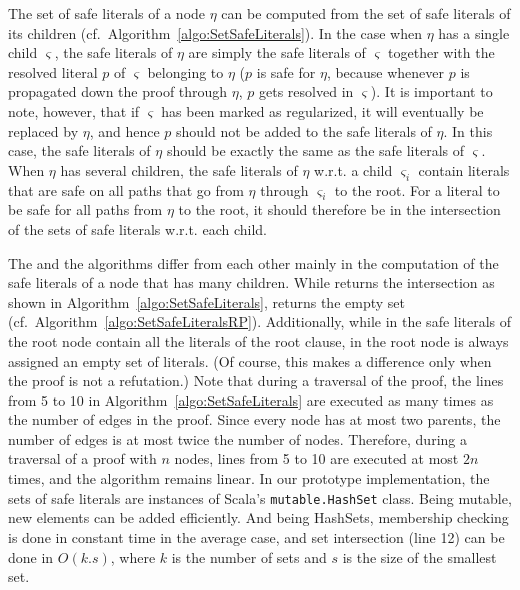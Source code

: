 The set of safe literals of a node $\eta$ can be computed from the set of safe
literals of its children (cf.\ Algorithm~\ref{algo:SetSafeLiterals}). In the case when $\eta$ has a single child $\varsigma$, the safe literals of $\eta$ are simply the safe literals of $\varsigma$ together with the resolved literal $p$ of $\varsigma$ belonging to $\eta$ ($p$ is safe for $\eta$, because whenever $p$ is propagated down the proof through $\eta$, $p$ gets resolved in $\varsigma$). It is important to note, however, that if $\varsigma$ has been marked as regularized, it will eventually be replaced by $\eta$, and hence $p$ should not be added to the safe literals of $\eta$. In this case, the safe literals of $\eta$ should be exactly the same as the safe literals of $\varsigma$. When $\eta$ has several children, the safe literals of $\eta$ w.r.t. a child $\varsigma_i$ contain literals that are safe on all paths that go from $\eta$ through $\varsigma_i$ to the root. For a literal to be safe for all paths from $\eta$ to the root, it should therefore be in the intersection of the sets of safe literals w.r.t. each child.


The {\RP} and the {\RPI} algorithms differ from each other mainly in the
computation of the safe literals of a node that has many children. While {\RPI}
returns the intersection as shown in Algorithm~\ref{algo:SetSafeLiterals}, {\RP}
returns the empty set (cf.\ Algorithm~\ref{algo:SetSafeLiteralsRP}). Additionally, while in {\RPI} the safe literals of the root node contain all the literals of the root clause, in {\RP} the root node is always assigned an empty set of literals. 
(Of course, this makes a difference only when the proof is not a refutation.)
Note that during a traversal of the proof, 
the lines from 5 to 10 in Algorithm~\ref{algo:SetSafeLiterals} are executed as many times as the number of edges in the proof. 
Since every node has at most two parents, the number of edges is at most twice the number of nodes. 
Therefore, during a traversal of a proof with $n$ nodes, lines from 5 to 10 are
executed at most $2n$ times, and the algorithm remains linear.
In our prototype implementation, the sets of safe literals are instances of Scala's 
\texttt{mutable.HashSet} class. Being mutable, new elements can be added efficiently.
And being HashSets, membership checking is done in constant time in the average case, 
and set intersection (line 12) can be done in $O(k.s)$, where $k$ is the number of sets and $s$ is the size of the smallest set.\\


